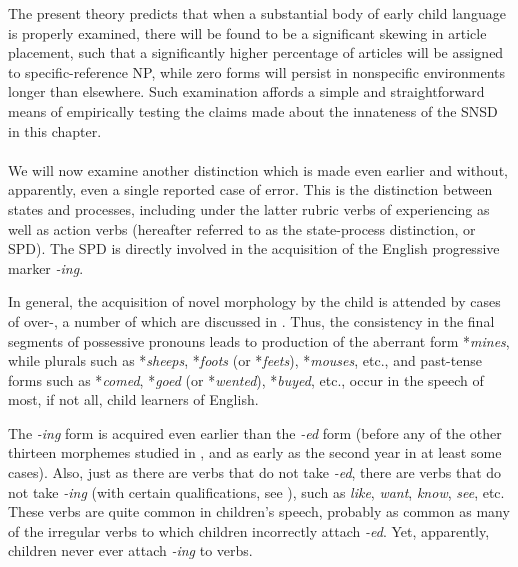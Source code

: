 The present theory predicts that when a substantial body of early child language is properly examined, there will be found to be a significant skewing in article placement, such that a significantly higher percentage of articles will be assigned to specific-reference NP, while zero forms will persist in nonspecific environments longer than elsewhere. Such examination affords a simple and straightforward means of empirically testing the claims made about the innateness of the SNSD in this chapter.\\\\

We will now examine another distinction which is made even earlier and without, apparently, even a single reported case of error. This is the distinction between states and processes, including under the latter rubric verbs of experiencing as well as action verbs (hereafter referred to as the state-process distinction, or SPD). The SPD is di\-rectly involved in the acquisition of the English progressive marker \textit{-ing}.

In general, the acquisition of novel morphology by the child is attended by cases of over-, a number of which are dis\-cussed in \citet{Cazden1968}. Thus, the consistency in the final segments of possessive pronouns leads to production of the aberrant form *\textit{mines}, while plurals such as *\textit{sheeps}, *\textit{foots} (or *\textit{feets}), *\textit{mouses}, etc., and past-tense forms such as *\textit{comed}, *\textit{goed} (or *\textit{wented}), *\textit{buyed}, etc., occur in the speech of most, if not all, child learners of English.

The \textit{-ing} form is acquired even earlier than the \textit{-ed} form (before any of the other thirteen morphemes studied in \citet{Brown1973}, and as early as the second year in at least some cases). Also, just as there are verbs that do not take \textit{-ed}, there are verbs that do not take \textit{-ing} (with certain qualifications, see \citealt{Sag1973}), such as \textit{like}, \textit{want}, \textit{know}, \textit{see}, etc. These verbs are quite common in children's speech, probably as common as many of the irregular verbs to which children incor\-rectly attach \textit{-ed}. Yet, apparently, children never ever attach \textit{-ing} to  verbs.

